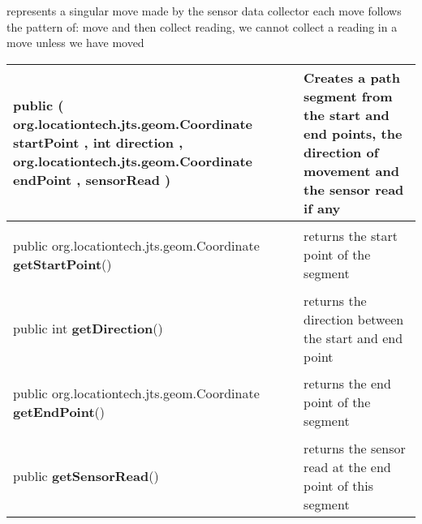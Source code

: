  {\scriptsize represents a singular move made by the sensor data collector\newline%
 each move follows the pattern of: move and then collect reading, \newline%
 we cannot collect a reading in a move unless we have moved
 
\vspace*{-5pt} 
\begin{tabularx}{\linewidth}{X|m{}}
\label{tab:PathSegment}
\begin{raggedleft}public  \textbf{\hyperref[tab:PathSegment]{\color{blue}{PathSegment}} }(\newline \hfill 
\hspace*{ 5pt} \textbf{org.locationtech.jts.geom.Coordinate} startPoint , \newline
 \hspace*{ 5pt} \textbf{int} direction , \newline
 \hspace*{ 5pt} \textbf{org.locationtech.jts.geom.Coordinate} endPoint , \newline
 \hspace*{ 5pt} \textbf{\hyperref[tab:Sensor]{\color{blue}{Sensor}}} sensorRead  )
\end{raggedleft} &
 Creates a path segment from the start and end points, the direction of movement and the sensor read if any\\ \hline 
\begin{raggedleft}public org.locationtech.jts.geom.Coordinate \textbf{getStartPoint}()
\end{raggedleft} &
 returns the start point of the segment\\ \hline 
\begin{raggedleft}public int \textbf{getDirection}()
\end{raggedleft} &
 returns the direction between the start and end point\\ \hline 
\begin{raggedleft}public org.locationtech.jts.geom.Coordinate \textbf{getEndPoint}()
\end{raggedleft} &
 returns the end point of the segment\\ \hline 
\begin{raggedleft}public \hyperref[tab:Sensor]{\color{blue}{Sensor}} \textbf{getSensorRead}()
\end{raggedleft} &
 returns the sensor read at the end point of this segment\\\end{tabularx}
}
